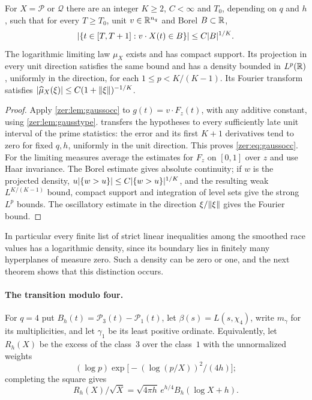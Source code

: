 \begin{theorem}\label{zer:thm:gausslocal}
For $X=\mathcal P$ or $\mathcal Q$ there are an integer $K\ge2$, $C<\infty$ and $T_0$, depending
on $q$ and $h$, such that for every $T\ge T_0$, unit $v\in\mathbb{R}^{n_q}$ and Borel $B\subset\mathbb{R}$,
\begin{equation}\label{zer:eq:gaussocc}
 \lvert\{t\in[T,T+1]:v\cdot X(t)\in B\}\rvert\le C\lvert B\rvert^{1/K}.
\end{equation}
The logarithmic limiting law $\mu_X$ exists and has compact support. Its projection in every
unit direction satisfies the same bound and has a density bounded in $L^p(\mathbb{R})$, uniformly in the
direction, for each $1\le p<K/(K-1)$. Its Fourier transform satisfies
$\lvert\widehat\mu_X(\xi)\rvert\le C(1+\lVert\xi\rVert)^{-1/K}$.
\end{theorem}
\begin{proof}
Apply \cref{zer:lem:gaussocc} to $g(t)=v\cdot F_z(t)$, with any additive constant, using
\cref{zer:lem:gausstype}.  transfers the hypotheses to every sufficiently
late unit interval of the prime statistics: the error and its first $K+1$ derivatives tend to
zero for fixed $q,h$, uniformly in the unit direction. This proves \eqref{zer:eq:gaussocc}. For
the limiting measures average the estimates for $F_z$ on $[0,1]$ over $z$ and use Haar
invariance. The Borel estimate gives absolute continuity; if $w$ is the projected density,
$u\lvert\{w>u\}\rvert\le C\lvert\{w>u\}\rvert^{1/K}$, and the resulting weak $L^{K/(K-1)}$ bound, compact
support and integration of level sets give the strong $L^p$ bounds. The oscillatory estimate in
the direction $\xi/\lVert\xi\rVert$ gives the Fourier bound.
\end{proof}

In particular every finite list of strict linear inequalities among the smoothed race values has
a logarithmic density, since its boundary lies in finitely many hyperplanes of measure zero. Such
a density can be zero or one, and the next theorem shows that this distinction occurs.

\paragraph{The transition modulo four.}
For $q=4$ put $B_h(t)=\mathcal P_3(t)-\mathcal P_1(t)$, let $\beta(s)=L(s,\chi_4)$, write
$m_\gamma$ for its multiplicities, and let $\gamma_1$ be its least positive ordinate. Equivalently,
let $R_h(X)$ be the excess of the class~$3$ over the class~$1$ with the unnormalized
weights
\[
 (\log p)\exp\bigl[-(\log(p/X))^2/(4h)\bigr];
\]
completing the square gives
\[
 R_h(X)/\sqrt X=\sqrt{4\pi h}\,e^{h/4}B_h(\log X+h).
\]

